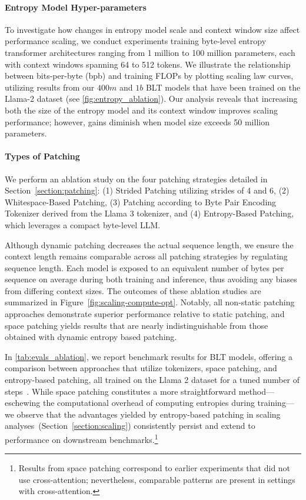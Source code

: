 \paragraph{Entropy Model Hyper-parameters} To investigate how changes in entropy model scale and context window size affect performance scaling, we conduct experiments training byte-level entropy transformer architectures ranging from 1 million to 100 million parameters, each with context windows spanning 64 to 512 tokens. We illustrate the relationship between bits-per-byte (bpb) and training FLOPs by plotting scaling law curves, utilizing results from our $400m$ and $1b$ {\textsc BLT} models that have been trained on the Llama-2 dataset (see \autoref{fig:entropy_ablation}). Our analysis reveals that increasing both the size of the entropy model and its context window improves scaling performance; however, gains diminish when model size exceeds 50 million parameters.

\paragraph{Types of Patching}

We perform an ablation study on the four patching strategies detailed in Section~\ref{section:patching}: (1) Strided Patching utilizing strides of 4 and 6, (2) Whitespace-Based Patching, (3) Patching according to Byte Pair Encoding Tokenizer derived from the Llama 3 tokenizer, and (4) Entropy-Based Patching, which leverages a compact byte-level LLM.

Although dynamic patching decreases the actual sequence length, we ensure the context length remains comparable across all patching strategies by regulating sequence length. Each model is exposed to an equivalent number of bytes per sequence on average during both training and inference, thus avoiding any biases from differing context sizes. The outcomes of these ablation studies are summarized in Figure~\ref{fig:scaling-compute-opt}. Notably, all non-static patching approaches demonstrate superior performance relative to static patching, and space patching yields results that are nearly indistinguishable from those obtained with dynamic entropy based patching.

In \autoref{tab:evals_ablation}, we report benchmark results for {\textsc BLT} models, offering a comparison between approaches that utilize tokenizers, space patching, and entropy-based patching, all trained on the Llama 2 dataset for a tuned number of steps~\citep{dubey2024llama}. While space patching constitutes a more straightforward method—eschewing the computational overhead of computing entropies during training—we observe that the advantages yielded by entropy-based patching in scaling analyses~(Section~\ref{section:scaling}) consistently persist and extend to performance on downstream benchmarks.\footnote{Results from space patching correspond to earlier experiments that did not use cross-attention; nevertheless, comparable patterns are present in settings with cross-attention.}

